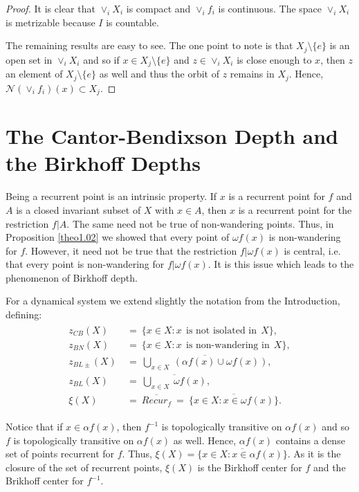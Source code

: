\documentclass[12pt]{amsart}
\def \ol {\overline}
\def \NN {\mathcal N}
\def \a {\alpha }
\def \om {\omega}
\numberwithin{equation}{section}
\begin{document}
\begin{proof} It is clear that $\vee_i X_i$ is compact and $\vee_i f_i$ is continuous. The space $\vee_i X_i$ is metrizable
because $I$ is countable.

The remaining results are easy to see. The one point to note is that  $X_j \setminus \{ e \}$
is an open set in $\vee_i X_i$ and so if $x \in X_j \setminus \{ e \}$ and $z \in \vee_i X_i$ is
close enough to $x$, then $z$ an element of $X_j \setminus \{ e \}$ as well  and thus the
orbit of $z$ remains in $X_j$. Hence, $\NN (\vee_i f_i)(x) \subset X_j$.

\end{proof}\vspace{.5cm}

\section{\textbf{The Cantor-Bendixson Depth and the Birkhoff Depths}} \vspace{.5cm}

Being a recurrent point is an intrinsic property.  If $x$ is a recurrent point for $f$ and $A$ is a closed invariant subset
of $X$ with $x \in A$, then $x$ is a recurrent point for the restriction $f|A$. The same need not be true of non-wandering points. Thus, in Proposition \ref{theo1.02} we showed that every point of $\om f(x)$ is non-wandering for $f$.  However, it need not be true that
the restriction $f|\om f(x)$ is central, i.e. that every point is non-wandering for $f|\om f(x)$. It is this issue which
leads to the phenomenon of Birkhoff depth.

For a  dynamical system we extend slightly the notation from the Introduction, defining:
\begin{align}\label{eq3.01}\begin{split}
z_{CB}(X) \ & = \ \{ x \in X : x \ \ \text{is not isolated in} \ \ X \}, \\
z_{BN}(X) \ & = \ \{ x \in X : x \ \ \text{is non-wandering in}  \ \ X \}, \\
z_{BL\pm}(X) \ & = \  \ol{ \bigcup_{x \in X} \ (\a f(x) \cup \om f(x))}, \\
z_{BL}(X) \  & = \ \ol{ \bigcup_{x \in X} \ \om f(x)},  \\
\xi(X) \ & =  \ \ol{Recur_f} \ = \ \ol{\{ x \in X : x \in \om f(x) \}}.
\end{split}\end{align}


Notice that if $x \in \a f(x)$, then $f^{-1}$ is topologically transitive on $\a f(x)$ and so $f$ is topologically transitive
on $\a f(x)$ as well. Hence, $\a f(x)$ contains a dense set of points recurrent for $f$. Thus,
$\xi(X)  =  \ol{\{ x \in X : x \in \a f(x) \}}$.  As it is the closure of the set  of recurrent points, $\xi(X)$ is the Birkhoff center for $f$
and the Brikhoff center for $f^{-1}$.
\end{document}
